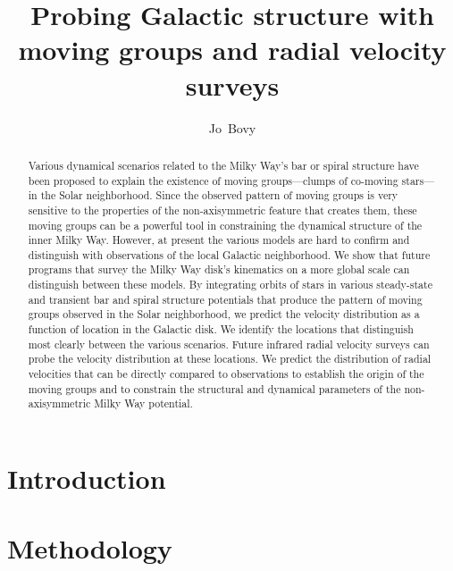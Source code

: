 \documentclass[12pt,preprint]{aastex}
\begin{document}
\title{Probing Galactic structure with moving groups and radial velocity surveys}
\author{Jo~Bovy}%

\begin{abstract}
Various dynamical scenarios related to the Milky Way's bar or spiral
structure have been proposed to explain the existence of moving
groups---clumps of co-moving stars---in the Solar neighborhood. Since
the observed pattern of moving groups is very sensitive to the
properties of the non-axisymmetric feature that creates them, these
moving groups can be a powerful tool in constraining the dynamical
structure of the inner Milky Way. However, at present the various
models are hard to confirm and distinguish with observations of the
local Galactic neighborhood. We show that future programs that survey
the Milky Way disk's kinematics on a more global scale can distinguish
between these models. By integrating orbits of stars in various
steady-state and transient bar and spiral structure potentials that
produce the pattern of moving groups observed in the Solar
neighborhood, we predict the velocity distribution as a function of
location in the Galactic disk. We identify the locations that
distinguish most clearly between the various scenarios. Future
infrared radial velocity surveys can probe the velocity distribution
at these locations. We predict the distribution of radial velocities
that can be directly compared to observations to establish the origin
of the moving groups and to constrain the structural and dynamical
parameters of the non-axisymmetric Milky Way potential.
\end{abstract}


\section{Introduction}




\section{Methodology}
\end{document}
